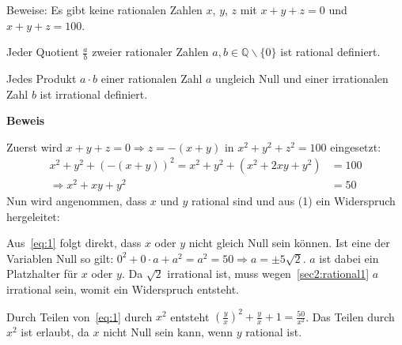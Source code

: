\documentclass[10pt, a4paper, reqno]{amsart}
\makeatletter
\renewcommand\proofname{Beweis}
\renewenvironment{proof}[1][\proofname]{\par
\pushQED{\qed}%
\normalfont \topsep6\p@\@plus6\p@\relax
\trivlist
\item\relax
{\bfseries#1}\hspace\labelsep\ignorespaces
}{%
\popQED\endtrivlist\@endpefalse
}
\makeatother
\begin{document}
\newpage
\begin{aufgabe}
  Beweise: Es gibt keine rationalen Zahlen $x$, $y$, $z$ mit $x + y + z = 0$ und
  $x + y + z = 100$.
\end{aufgabe}
\begin{lemma}\label{sec2:rational1}
  Jeder Quotient $\frac{a}{b}$ zweier rationaler Zahlen $a,b∈ℚ\backslash\{0\}$
  ist rational definiert.
\end{lemma}
\begin{lemma}\label{sec2:rational2}
  Jedes Produkt $ a\cdot b $ einer rationalen Zahl $a$ ungleich Null und einer
  irrationalen Zahl $b$ ist irrational definiert.
\end{lemma}
\begin{proof}
  Zuerst wird $x+y+z = 0 \Rightarrow z = -(x+y)$ in $x^2+y^2+z^2 = 100$
  eingesetzt:
  \begin{equation}
    \label{eq:1}
    \begin{split}
      x^2+y^2+(-(x+y))^2 = x^2+y^2+(x^2+2xy+y^2) &= 100\\
      \Rightarrow x^2+xy+y^2&=50
    \end{split}
  \end{equation}
  Nun wird angenommen, dass $x$ und $y$ rational sind und aus (1) ein Widerspruch hergeleitet:

  Aus~\eqref{eq:1} folgt direkt, dass $x$ oder $y$ nicht gleich Null sein können. Ist eine der Variablen
  Null so gilt: $0^2+0\cdot a+a^2=a^2=50\Rightarrow a = \pm5\sqrt{2}$. $a$ ist
  dabei ein Platzhalter für $x$ oder $y$. Da $\sqrt{2}$ irrational ist, muss
  wegen~\autoref{sec2:rational1} $a$ irrational sein, womit ein Widerspruch
  entsteht.
  
  Durch Teilen von~\eqref{eq:1} durch $x^2$ entsteht
  $(\frac{y}{x})^2+\frac{y}{x}+1=\frac{50}{x^2}$. Das Teilen durch $x^2$ ist
  erlaubt, da $x$ nicht Null sein kann, wenn $y$ rational ist.
  

\end{proof}
\end{document}
